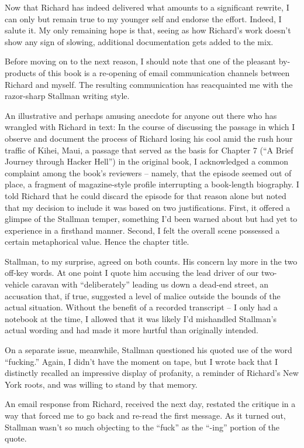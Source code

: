 Now that Richard has indeed delivered what amounts to a significant
rewrite, I can only but remain true to my younger self and endorse the
effort. Indeed, I salute it. My only remaining hope is that, seeing as
how Richard's work doesn't show any sign of slowing, additional
documentation gets added to the mix.

Before moving on to the next reason, I should note that one of the pleasant
by-products of this book is a re-opening of email communication
channels between Richard and myself. The resulting communication has
reacquainted me with the razor-sharp Stallman writing style.

An illustrative and perhaps amusing anecdote for anyone out there who
has wrangled with Richard in text: In the course of discussing the
passage in which I observe and document the process of Richard losing
his cool amid the rush hour traffic of Kihei, Maui, a passage that
served as the basis for Chapter 7 (``A Brief Journey through Hacker
Hell'') in the original book, I acknowledged a common complaint among
the book's reviewers -- namely, that the episode seemed out of place,
a fragment of magazine-style profile interrupting a book-length
biography. I told Richard that he could discard the episode for that
reason alone but noted that my decision to include it was based on two
justifications. First, it offered a glimpse of the Stallman temper,
something I'd been warned about but had yet to experience in a
firsthand manner. Second, I felt the overall scene possessed a certain
metaphorical value. Hence the chapter title.

Stallman, to my surprise, agreed on both counts. His concern lay more
in the two off-key words. At one point I quote him accusing the lead
driver of our two-vehicle caravan with ``deliberately'' leading us
down a dead-end street, an accusation that, if true, suggested a level
of malice outside the bounds of the actual situation. Without the
benefit of a recorded transcript -- I only had a notebook at the time,
I allowed that it was likely I'd mishandled Stallman's actual wording
and had made it more hurtful than originally intended.

On a separate issue, meanwhile, Stallman questioned his quoted use of
the word ``fucking.'' Again, I didn't have the moment on tape, but I
wrote back that I distinctly recalled an impressive display of
profanity, a reminder of Richard's New York roots, and was willing to
stand by that memory.

An email response from Richard, received the next day, restated the
critique in a way that forced me to go back and re-read the first
message. As it turned out, Stallman wasn't so much objecting to the
``fuck'' as the ``-ing'' portion of the quote.

